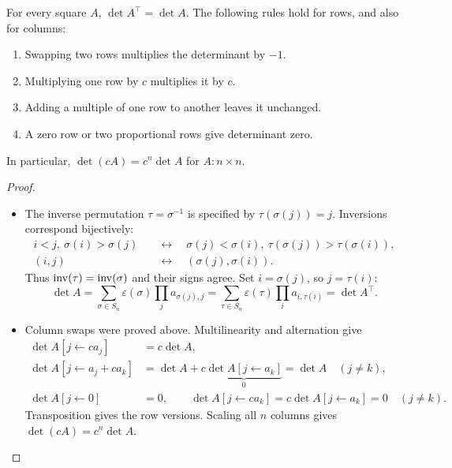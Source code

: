 \begin{proposition}\label{prop:05:operations}
For every square \(A\), \(\det A^\top=\det A\).
The following rules hold for rows, and also for columns:
\begin{enumerate}
\item Swapping two rows multiplies the determinant by \(-1\).
\item Multiplying one row by \(c\) multiplies it by \(c\).
\item Adding a multiple of one row to another leaves it unchanged.
\item A zero row or two proportional rows give determinant zero.
\end{enumerate}
In particular, \(\det(cA)=c^n\det A\) for \(A:n\times n\).
\end{proposition}
\begin{proof}
\begin{itemize}
\item The inverse permutation \(\tau=\sigma^{-1}\) is specified by
  \(\tau(\sigma(j))=j\). Inversions correspond bijectively:
  \[
  \begin{aligned}
  i<j,\ \sigma(i)>\sigma(j)
  &\quad\longleftrightarrow\quad
  \sigma(j)<\sigma(i),\ \tau(\sigma(j))>\tau(\sigma(i)),\\
  (i,j)&\quad\longleftrightarrow\quad(\sigma(j),\sigma(i)).
  \end{aligned}
  \]
  Thus \(\operatorname{inv}(\tau)=\operatorname{inv}(\sigma)\) and their signs agree.
  Set \(i=\sigma(j)\), so \(j=\tau(i)\):
  \[
  \det A
  =\sum_{\sigma\in S_n}\varepsilon(\sigma)\prod_j a_{\sigma(j),j}
  =\sum_{\tau\in S_n}\varepsilon(\tau)\prod_i a_{i,\tau(i)}
  =\det A^\top.
  \]
\item Column swaps were proved above. Multilinearity and alternation give
  \[
  \begin{aligned}
  \det A[j\leftarrow ca_j]&=c\det A,\\
  \det A[j\leftarrow a_j+ca_k]
    &=\det A+c\underbrace{\det A[j\leftarrow a_k]}_{0}
      =\det A\quad(j\ne k),\\
  \det A[j\leftarrow0]&=0,\qquad
  \det A[j\leftarrow ca_k]=c\det A[j\leftarrow a_k]=0\quad(j\ne k).
  \end{aligned}
  \]
  Transposition gives the row versions. Scaling all \(n\) columns gives
  \(\det(cA)=c^n\det A\).
\end{itemize}
\end{proof}

